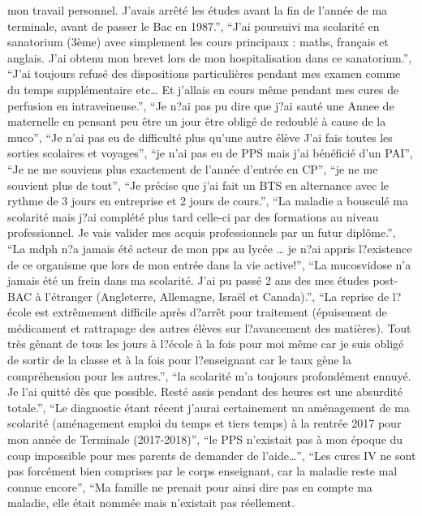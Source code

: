 \documentclass[
  letterpaper,
  DIV=11,
  numbers=noendperiod]{scrartcl}
\begin{document}
\begin{itemize}
  mon travail personnel. J'avais arrêté les études avant la fin de
  l'année de ma terminale, avant de passer le Bac en 1987.'', ``J'ai
  poursuivi ma scolarité en sanatorium (3ème) avec simplement les cours
  principaux : maths, français et anglais. J'ai obtenu mon brevet lors
  de mon hospitalisation dans ce sanatorium.'', ``J'ai toujours refusé
  des dispositions particulières pendant mes examen comme du temps
  supplémentaire etc\ldots{} Et j'allais en cours même pendant mes cures
  de perfusion en intraveineuse.'', ``Je n?ai pas pu dire que j?ai sauté
  une Annee de maternelle en pensant peu être un jour être obligé de
  redoublé à cause de la muco'', ``Je n'ai pas eu de difficulté plus
  qu'une autre élève J'ai fais toutes les sorties scolaires et
  voyages'', ``je n'ai pas eu de PPS mais j'ai bénéficié d'un PAI'',
  ``Je ne me souviens plus exactement de l'année d'entrée en CP'', ``je
  ne me souvient plus de tout'', ``Je précise que j'ai fait un BTS en
  alternance avec le rythme de 3 jours en entreprise et 2 jours de
  cours.'', ``La maladie a bousculé ma scolarité mais j?ai complété plus
  tard celle-ci par des formations au niveau professionnel. Je vais
  valider mes acquis professionnels par un futur diplôme.'', ``La mdph
  n?a jamais été acteur de mon pps au lycée \ldots{} je n?ai appris
  l?existence de ce organisme que lors de mon entrée dans la vie
  active!'', ``La mucosvidose n'a jamais été un frein dans ma scolarité.
  J'ai pu passé 2 ans des mes études post- BAC à l'étranger (Angleterre,
  Allemagne, Israël et Canada).'', ``La reprise de l?école est
  extrêmement difficile après d?arrêt pour traitement (épuisement de
  médicament et rattrapage des autres élèves sur l?avancement des
  matières). Tout très gênant de tous les jours à l?école à la fois pour
  moi même car je suis obligé de sortir de la classe et à la fois pour
  l?enseignant car le taux gène la compréhension pour les autres.'',
  ``la scolarité m'a toujours profondément ennuyé. Je l'ai quitté dès
  que possible. Resté assis pendant des heures est une absurdité
  totale.'', ``Le diagnostic étant récent j'aurai certainement un
  aménagement de ma scolarité (aménagement emploi du temps et tiers
  temps) à la rentrée 2017 pour mon année de Terminale (2017-2018)'',
  ``le PPS n'existait pas à mon époque du coup impossible pour mes
  parents de demander de l'aide\ldots{}'', ``Les cures IV ne sont pas
  forcément bien comprises par le corps enseignant, car la maladie reste
  mal connue encore'', ``Ma famille ne prenait pour ainsi dire pas en
  compte ma maladie, elle était nommée mais n'existait pas réellement.

\end{itemize}
\end{document}
